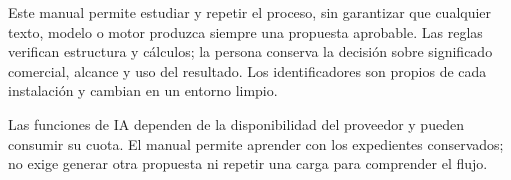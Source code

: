 \documentclass[11pt,a4paper,oneside,openany]{book}
\begin{document}
Este manual permite estudiar y repetir el proceso, sin garantizar que
cualquier texto, modelo o motor produzca siempre una propuesta aprobable.
Las reglas verifican estructura y cálculos; la persona conserva la decisión
sobre significado comercial, alcance y uso del resultado. Los identificadores
son propios de cada instalación y cambian en un entorno limpio.

Las funciones de IA dependen de la disponibilidad del proveedor y pueden
consumir su cuota. El manual permite aprender con los expedientes conservados;
no exige generar otra propuesta ni repetir una carga para comprender el flujo.

\clearpage
\begingroup
\setlength{\parskip}{0pt}
\tableofcontents
\endgroup
\mainmatter













\end{document}
